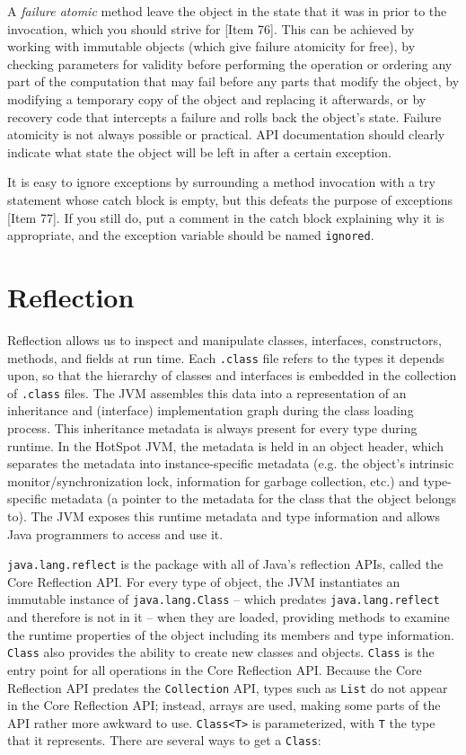 \documentclass[8pt, table, xcdraw]{article}%
\begin{document}
A \emph{failure atomic} method leave the object in the state that it was in prior to the invocation, which you should strive for [Item 76]. This can be achieved by working with immutable objects (which give failure atomicity for free), by checking parameters for validity before performing the operation or ordering any part of the computation that may fail before any parts that modify the object, by modifying a temporary copy of the object and replacing it afterwards, or by recovery code that intercepts a failure and rolls back the object's state. Failure atomicity is not always possible or practical. API documentation should clearly indicate what state the object will be left in after a certain exception.

It is easy to ignore exceptions by surrounding a method invocation with a try statement whose catch block is empty, but this defeats the purpose of exceptions [Item 77]. If you still do, put a comment in the catch block explaining why it is appropriate, and the exception variable should be named \lstinline{ignored}.

\section{Reflection}

Reflection allows us to inspect and manipulate classes, interfaces, constructors, methods, and fields at run time. Each \lstinline{.class} file refers to the types it depends upon, so that the hierarchy of classes and interfaces is embedded in the collection of \lstinline{.class} files. The JVM assembles this data into a representation of an inheritance and (interface) implementation graph during the class loading process. This inheritance metadata is always present for every type during runtime. In the HotSpot JVM, the metadata is held in an object header, which separates the metadata into instance-specific metadata (e.g. the object's intrinsic monitor/synchronization lock, information for garbage collection, etc.) and type-specific metadata (a pointer to the metadata for the class that the object belongs to). The JVM exposes this runtime metadata and type information and allows Java programmers to access and use it.

\lstinline{java.lang.reflect} is the package with all of Java's reflection APIs, called the Core Reflection API. For every type of object, the JVM instantiates an immutable instance of \lstinline{java.lang.Class} -- which predates \lstinline{java.lang.reflect} and therefore is not in it -- when they are loaded, providing methods to examine the runtime properties of the object including its members and type information. \lstinline{Class} also provides the ability to create new classes and objects. \lstinline{Class} is the entry point for all operations in the Core Reflection API. Because the Core Reflection API predates the \lstinline{Collection} API, types such as \lstinline{List} do not appear in the Core Reflection API; instead, arrays are used, making some parts of the API rather more awkward to use. \lstinline{Class<T>} is parameterized, with \lstinline{T} the type that it represents. There are several ways to get a \lstinline{Class}:
\end{document}
